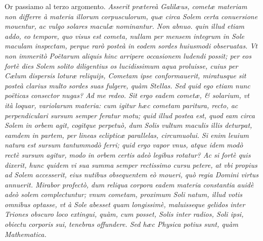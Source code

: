 \documentclass[11pt,twoside,openany]{book}
\begin{document}
\par\bigskip\noindent{}\enspace Or passiamo al terzo argomento. \textit{Asserit prætereà Galilæus, cometæ materiam non differre à materia illorum corpusculorum, quæ circa Solem certa conuersione mouentur, ac vulgo solares maculæ nominantur. Non abnuo. quin illud etiam addo, eo tempore, quo visus est cometa, nullam per mensem integrum in Sole maculam inspectam, perque rarò posteà in eodem sordes huiusmodi obseruatas. Vt non immeritò Poëtarum aliquis hinc arripere occasionem ludendi possit; per eos fortè dies Solem solito diligentius os lucidissimum aqua proluisse, cuius per Cælum dispersis loturæ reliquijs, Cometam ipse conformauerit, miratusque sit posteà clarius multo sordes suas fulgere, quàm Stellas. Sed quid ego etiam nunc poëticas consector nugas? Ad me redeo. Sit ergo eadem cometæ, \& solarium, vt ità loquar, variolarum materia: cum igitur hæc cometam paritura, recto, ac perpendiculari sursum semper feratur motu; quid illud postea est, quod eam circa Solem in orbem agit, cogitque perpetuò, dum Solis vultum maculis illis deturpat, eamdem in partem, per lineas eclipticæ parallelas, circumuolui.}\textit{ }\textit{Si enim leuium natura est sursum tantummodò ferri; quid ergo vapor vnus, atque idem modò rectè sursum agitur, modo in orbem certis adeò legibus rotatur? Ac si fortè quis dixerit, hunc quidem vi sua summa semper rectissimo cursu petere, at vbi propius ad Solem accesserit, eius nutibus obsequentem eò moueri, quò regia Domini virtus annuerit. Mirabor profectò, dum reliqua corpora eadem materia constantia auidè adeò solem complectuntur; vnum cometam, proximum Soli natum, illud votis omnibus optasse, vt à Sole abesset quam longissimè, maluisseque gelidos inter }\textit{Triones obscuro loco extingui, quàm, cum posset, Solis inter radios, Soli ipsi, obiectu corporis sui, }\textit{tenebras offundere. Sed hæc Physica potius sunt, quàm Mathematica.}
\end{document}
